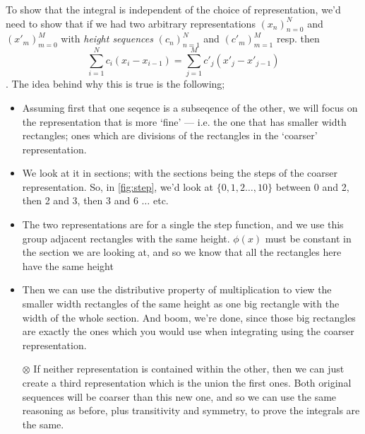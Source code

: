 To show that the integral is independent of the choice of representation, we'd need to show that if we had two arbitrary representations $(x_n)_{n=0}^N$ and $(x'_m)_{m=0}^M$ with \emph{height sequences} $(c_n)_{n=1}^N$ and $(c'_m)_{m=1}^M$ resp. then $$\sum_{i=1}^N c_i(x_{i} - x_{i-1}) = \sum_{j=1}^M c'_j(x'_{j} - x'_{j-1})$$. 
The idea behind why this is true is the following; 
\begin{itemize}
\renewcommand\labelitemi{$\times$}
\item
Assuming first that one seqence is a subseqence of the other, we will focus on the representation that is more `fine' --- i.e. the one that has smaller width rectangles; ones which are divisions of the rectangles in the `coarser' representation. 
\item
We look at it in sections; with the sections being the steps of the coarser representation. So, in \ref{fig:step}, we'd look at $\{0, 1, 2 \ldots, 10\}$ between 0 and 2, then 2 and 3, then 3 and 6 $\ldots$ etc. 
\item
The two representations are for a single the step function, and we use this group adjacent rectangles with the same height. $\phi(x)$ must be constant in the section we are looking at, and so we know that all the rectangles here have the same height
\item
Then we can use the distributive property of multiplication to view the smaller width rectangles of the same height as one big rectangle with the width of the whole section. And boom, we're done, since those big rectangles are exactly the ones which you would use when integrating using the coarser representation.
\item[$\otimes$]
If neither representation is contained within the other, then we can just create a third representation which is the union the first ones. Both original sequences will be coarser than this new one, and so we can use the same reasoning as before, plus transitivity and symmetry, to prove the integrals are the same.
\end{itemize}

